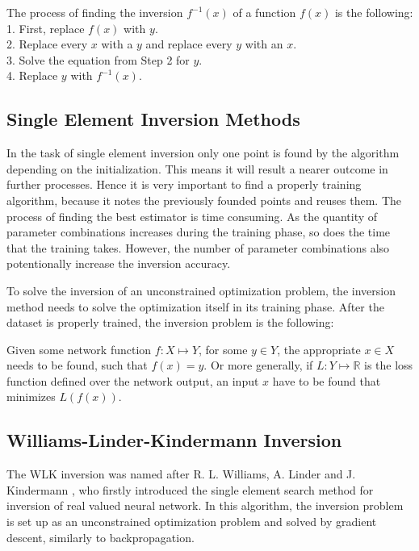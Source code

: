 \bigskip \noindent The process of finding the inversion $f^{-1}(x)$ of a function $f(x)$ is the following:\\
1. First, replace $f(x)$ with $y$.\\
2. Replace every $x$ with a $y$ and replace every $y$ with an $x$. \\
3. Solve the equation from Step 2 for $y$. \\
4. Replace $y$ with $f^{-1}(x)$. 



\subsection{Single Element Inversion Methods}

In the task of single element inversion only one point is found by the algorithm depending on the initialization. This means it will result a nearer outcome in further processes. Hence it is very important to find a properly training algorithm, because it notes the previously founded points and reuses them. The process of finding the best estimator is time consuming. As the quantity of parameter combinations increases during the training phase, so does the time that the training takes. However, the number of parameter combinations also potentionally increase the inversion accuracy.\bigskip

To solve the inversion of an unconstrained optimization problem, the inversion method needs to solve the optimization itself in its training phase. After the dataset is properly trained, the inversion problem is the following:\medskip

Given some network function $f : X \mapsto Y$, for some $y \in Y$, the appropriate $x \in X$ needs to be found, such that $f(x) = y$. Or more generally, if $L : Y \mapsto \mathbb{R}$ is the loss function defined over the network output, an input $x$ have to be found that minimizes $L(f(x))$. 


\subsection{Williams-Linder-Kindermann Inversion}

\label{para:wlk-inv}The WLK inversion was named after R. L. Williams, A. Linder and J. Kindermann \cite{KINDERMANN1990277}, who firstly introduced the single element search method for inversion of real valued neural network. In this algorithm, the inversion problem is set up as an unconstrained optimization problem and solved by gradient descent, similarly to backpropagation. \medskip

